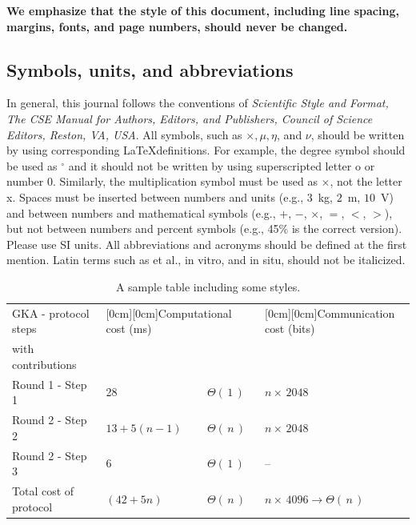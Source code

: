 \documentclass{article}
\begin{document}
\textbf{We emphasize that the style of this document, including line spacing, margins, fonts, and page numbers, should never be changed.}  

\subsection{Symbols, units, and abbreviations}

In general, this journal follows the conventions of \textit{Scientific Style and Format, The CSE Manual for Authors, Editors, and Publishers, Council of Science Editors, Reston, VA, USA}. All symbols, such as $\times, \mu, \eta$, and $\nu$, should be written by using corresponding \LaTeX definitions. For example, the degree symbol should be used as $^{\circ}$ and it should not be written by using superscripted letter o or number 0. Similarly, the multiplication symbol must be used as $\times$, not the letter x. Spaces must be inserted between numbers and units (e.g., $3$~kg, $2$~m, $10$~V) and between numbers and mathematical symbols (e.g., $+$, $-$, $\times$, $=$, $<$, $>$), but not between numbers and percent symbols (e.g., 45{\%} is the correct version). Please use SI units. All abbreviations and acronyms should be defined at the first mention. Latin terms such as et al., in vitro, and in situ, should not be italicized. 

\begin{table}[h!]
\caption{A sample table including some styles.}
\begin{center}
\begin{tabular}{|l|l|l|l|}
\hline
GKA - protocol steps & 
\multicolumn{2}{|l|}{\raisebox{-1.50ex}[0cm][0cm]{Computational cost (ms)}}& 
\raisebox{-1.50ex}[0cm][0cm]{Communication cost (bits)} \\
with contributions& 
\multicolumn{2}{|l|}{} & 
 \\
\hline
Round 1 - Step 1& 
28& 
${\Theta }(\, 1\, )$& 
$n\times \, 2048$ \\
\hline
Round 2 - Step 2& 
$13+5(n-1)$& 
${\Theta }(\, n\, )$& 
$n\times \, 2048$ \\
\hline
Round 2 - Step 3& 
6& 
${\Theta }(\, 1\, )$& 
-- \\
\hline
Total cost of protocol& 
$(42+5n)$& 
${\Theta }(\, n\, )$& 
${n\times \, }4096  \to  {\Theta }(\, n\, )$ \\
\hline
\end{tabular}
\label{tab1}
\end{center}\vs{-4mm}
\end{table}
\end{document}
